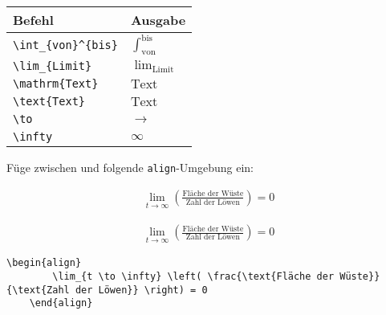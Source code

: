 \documentclass["WS\space 16-17\space -\space LaTeX-Kurs\space -\space Praesentation\space -\space 1.tex"]{subfiles}
\begin{document}
\begin{frame}[fragile]
	\begin{center}
		\begin{tabular}{ll}
			\toprule
			Befehl							&	Ausgabe					\\ \midrule
			\lstinline|\int_{von}^{bis}|		&	$\int_{\text{von}}^{\text{bis}}$		\\ \addlinespace[0.5em]
			\lstinline|\lim_{Limit}|		&	$\lim_{\text{Limit}}$		\\
			\lstinline|\mathrm{Text}|		&	$\mathrm{Text}$		
      \\
			\lstinline|\text{Text}|		&	$\text{Text}$		
			\\
			\lstinline|\to|					&	$\to$		\\
			\lstinline|\infty|					&	$\infty$		\\
			\bottomrule
		\end{tabular}
	\end{center}
	\pause\btVFill
	\Aufgabee
		Füge zwischen  und  folgende \lstinline[basicstyle=\normalfont\normalsize]|align|-Umgebung ein:
	\begin{outputbox}
	    \begin{align}
		    \lim_{t \to \infty} \left( \frac{\text{Fläche der Wüste}}{\text{Zahl der Löwen}} \right) = 0
	    \end{align}	
    \end{outputbox}
	\vspace{0.3cm}
\end{frame}
\begin{frame}[fragile]
	\Losung
	\begin{outputbox}
	    \begin{align}
	      \lim_{t \to \infty} \left( \frac{\text{Fläche der Wüste}}{\text{Zahl der Löwen}} \right) = 0
	    \end{align}
	\end{outputbox}

	\Code
	\begin{lstlisting}[gobble=4]
    \begin{align}
        \lim_{t \to \infty} \left( \frac{\text{Fläche der Wüste}}{\text{Zahl der Löwen}} \right) = 0
    \end{align}
	\end{lstlisting}
\end{frame}
\end{document}
